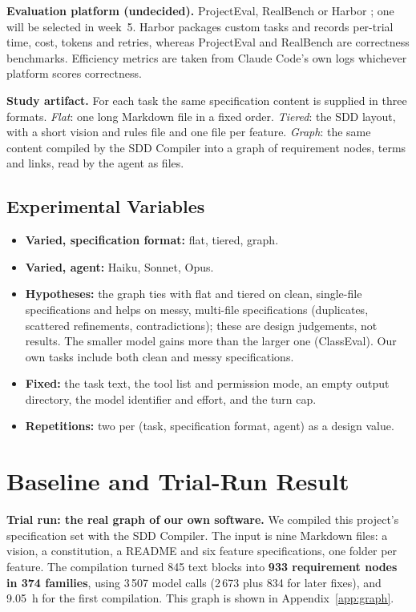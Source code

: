 \documentclass{article}
\begin{document}
\textbf{Evaluation platform (undecided).} ProjectEval, RealBench or Harbor \citep{harbor_docs}; one will be selected in week~5.
Harbor packages custom tasks and records per-trial time, cost, tokens and retries, whereas ProjectEval and RealBench are correctness
benchmarks. Efficiency metrics are taken from Claude Code's own logs whichever platform scores correctness.

\textbf{Study artifact.} For each task the same specification content is supplied in three formats.
\emph{Flat}: one long Markdown file in a fixed order.
\emph{Tiered}: the SDD layout, with a short vision and rules file and one file per feature.
\emph{Graph}: the same content compiled by the SDD Compiler into a graph of requirement nodes, terms and links, read by the agent as files.

\subsection{Experimental Variables}
\begin{itemize}
  \item \textbf{Varied, specification format:} flat, tiered, graph.
  \item \textbf{Varied, agent:} Haiku, Sonnet, Opus.
  \item \textbf{Hypotheses:} the graph ties with flat and tiered on clean, single-file specifications and helps on messy,
        multi-file specifications (duplicates, scattered refinements, contradictions); these are design judgements, not results. The smaller model gains more
        than the larger one (ClassEval). Our own tasks include both clean and messy specifications.
  \item \textbf{Fixed:} the task text, the tool list and permission mode, an empty output
        directory, the model identifier and effort, and the turn cap.
  \item \textbf{Repetitions:} two per (task, specification format, agent) as a design value.

\end{itemize}

\section{Baseline and Trial-Run Result}

\textbf{Trial run: the real graph of our own software.} We compiled this project's specification set with the SDD Compiler. The input is nine Markdown files: a vision, a constitution, a README and six feature specifications, one folder per feature.
The compilation turned 845 text blocks into \textbf{933 requirement nodes in 374 families},
using 3\,507 model calls (2\,673 plus 834 for later fixes), and 9.05~h for the first compilation.
This graph is shown in Appendix~\ref{app:graph}.
\end{document}
